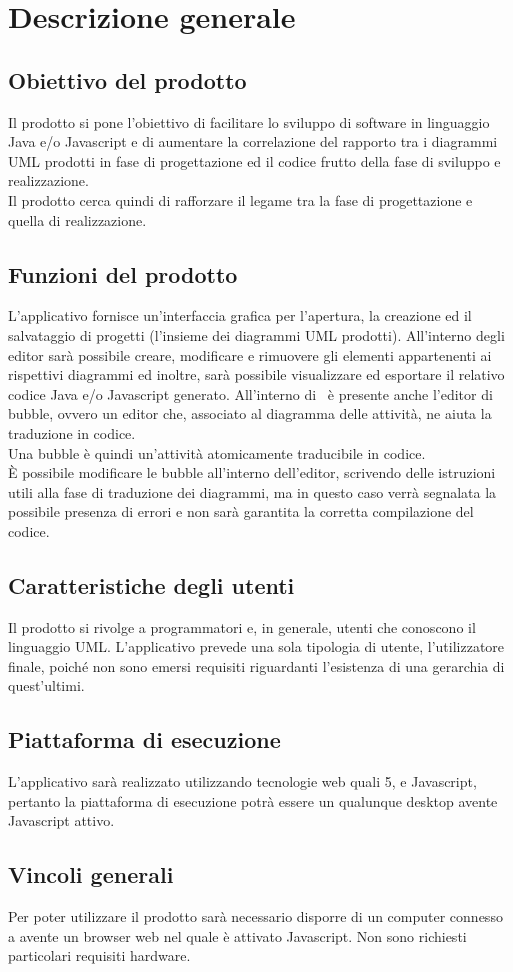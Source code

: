 \documentclass[../AnalisiDeiRequisiti.tex]{subfiles}
\begin{document}
	\section{Descrizione generale}
		\subsection{Obiettivo del prodotto}
			Il prodotto si pone l'obiettivo di facilitare lo sviluppo di software in
			linguaggio Java e/o Javascript e di aumentare la correlazione del rapporto tra
			i diagrammi UML prodotti in fase di progettazione ed il codice frutto della
			fase di sviluppo e realizzazione.\\
			Il prodotto cerca quindi di rafforzare il legame tra la fase di progettazione
			e quella di realizzazione.
		\subsection{Funzioni del prodotto}
			L'applicativo fornisce un'interfaccia grafica per l'apertura, la
			creazione ed il salvataggio di progetti (l'insieme dei diagrammi UML prodotti).
			All'interno degli editor sarà possibile creare, modificare e rimuovere gli
			elementi appartenenti ai rispettivi diagrammi ed inoltre, sarà possibile
			visualizzare ed esportare il relativo codice Java e/o Javascript generato.
			All'interno di \progetto\ è presente anche l'editor di bubble, ovvero un editor
			che, associato al diagramma delle attività, ne aiuta la traduzione in codice.\\
			Una bubble è quindi un'attività atomicamente traducibile in codice.\\
			È possibile modificare le bubble all'interno dell'editor, scrivendo delle istruzioni
			utili alla fase di traduzione dei diagrammi, ma in questo caso verrà segnalata la
			possibile presenza di errori e non sarà garantita la corretta compilazione
			del codice.
		\subsection{Caratteristiche degli utenti}
			Il prodotto si rivolge a programmatori e, in generale, utenti che conoscono
			il linguaggio UML. L'applicativo prevede una sola tipologia di utente,
			l'utilizzatore finale, poiché non sono emersi requisiti riguardanti
			l'esistenza di una gerarchia di quest'ultimi.
		\subsection{Piattaforma di esecuzione}
			L'applicativo sarà realizzato utilizzando tecnologie web quali 5,
			 e Javascript, pertanto la piattaforma di esecuzione potrà essere un
			qualunque  desktop avente Javascript attivo.
		\subsection{Vincoli generali}
			Per poter utilizzare il prodotto sarà necessario disporre di un computer
			connesso a  avente un browser web nel quale è attivato
			Javascript. Non sono richiesti particolari requisiti hardware.
\end{document}

